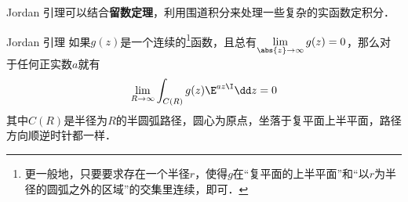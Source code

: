 

Jordan 引理可以结合\textbf{留数定理}，利用围道积分来处理一些复杂的实函数定积分．

\begin{theorem}{Jordan 引理}
如果$g(z)$是一个连续的\footnote{更一般地，只要要求存在一个半径$r$，使得$g$在“复平面的上半平面”和“以$r$为半径的圆弧之外的区域”的交集里连续，即可．}函数，且总有$\lim\limits_{\abs{z}\to\infty}g(z)=0$，那么对于任何正实数$a$就有
\begin{equation}
\lim\limits_{R\to \infty}\int_{C(R)}g(z)\E^{az\I}\dd z=0
\end{equation}
其中$C(R)$是半径为$R$的半圆弧路径，圆心为原点，坐落于复平面上半平面，路径方向顺逆时针都一样．


\end{theorem}
















